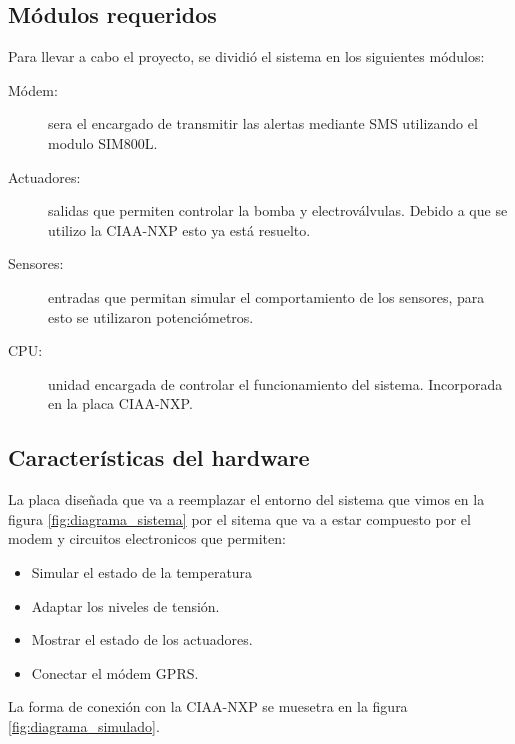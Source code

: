 \subsection{ Módulos requeridos}
Para llevar a cabo el proyecto, se dividió el sistema en los siguientes módulos:
\begin{description}
  \item[Módem:] sera el encargado de transmitir las alertas mediante SMS utilizando el modulo SIM800L.
  \item[Actuadores:] salidas que permiten controlar la bomba y electroválvulas. Debido a que se utilizo la CIAA-NXP esto ya está resuelto.
  \item[Sensores:] entradas que permitan simular el comportamiento de los sensores, para esto se utilizaron potenciómetros.
  \item[CPU:] unidad encargada de controlar el funcionamiento del sistema. Incorporada en la placa CIAA-NXP. 
\end{description}

\subsection{Características del hardware}

La placa diseñada que va a reemplazar el entorno del sistema que vimos en la figura \ref{fig:diagrama_sistema} por el sitema que va a estar compuesto por el modem y circuitos electronicos que permiten:
\begin{itemize}
  \item Simular el estado de la temperatura
  \item Adaptar los niveles de tensión.
  \item Mostrar el estado de los actuadores.
  \item Conectar el módem GPRS.
\end{itemize}

    La forma de conexión con la CIAA-NXP se muesetra en la figura \ref{fig:diagrama_simulado}.

